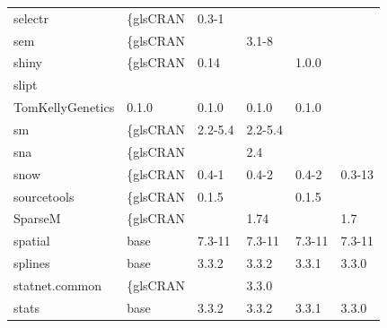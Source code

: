 \begin{longtable}{llllll}
selectr                       & \{gls{CRAN}                      & 0.3-1       &             &                &                    \\
\rowcolor{black!10}
sem                           & \{gls{CRAN}                      &             & 3.1-8       &                &                   \\
\rowcolor{black!5}
shiny                         & \{gls{CRAN}                      & 0.14        &             & 1.0.0          &                    \\
\rowcolor{black!10}
slipt                         & \begin{tabular}[c]{@{}l@{}}GitHub \\ TomKellyGenetics \end{tabular}  & 0.1.0       & 0.1.0       & 0.1.0          & 0.1.0             \\
\rowcolor{black!5}
sm                            & \{gls{CRAN}                      & 2.2-5.4     & 2.2-5.4     &                &                    \\
\rowcolor{black!10}
sna                           & \{gls{CRAN}                      &             & 2.4         &                &                   \\
\rowcolor{black!5}
snow                          & \{gls{CRAN}                      & 0.4-1       & 0.4-2       & 0.4-2          & 0.3-13             \\
\rowcolor{black!10}
sourcetools                   & \{gls{CRAN}                      & 0.1.5       &             & 0.1.5          &                   \\
\rowcolor{black!5}
SparseM                       & \{gls{CRAN}                      &             & 1.74        &                & 1.7                \\
\rowcolor{black!10}
spatial                       & base                      & 7.3-11      & 7.3-11      & 7.3-11         & 7.3-11            \\
\rowcolor{black!5}
splines                       & base                      & 3.3.2       & 3.3.2       & 3.3.1          & 3.3.0              \\
\rowcolor{black!10}
statnet.common                & \{gls{CRAN}                      &             & 3.3.0       &                &                   \\
\rowcolor{black!5}
stats                         & base                      & 3.3.2       & 3.3.2       & 3.3.1          & 3.3.0              \\

\end{longtable}
